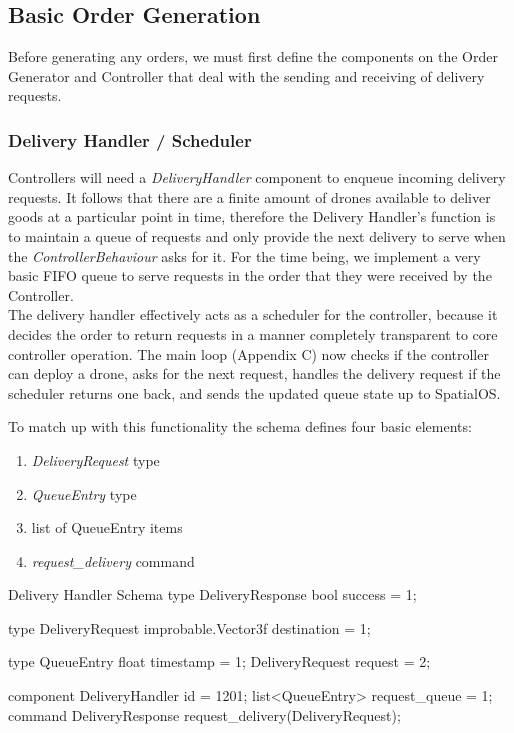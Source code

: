 \documentclass[a4paper,12pt,titlepage]{article}
\begin{document}
\subsection{Basic Order Generation}
Before generating any orders, we must first define the components on the Order Generator and Controller that deal with the sending and receiving of delivery requests.

\subsubsection{Delivery Handler / Scheduler}
Controllers will need a \textit{DeliveryHandler} component to enqueue incoming delivery requests. It follows that there are a finite amount of drones available to deliver goods at a particular point in time, therefore the Delivery Handler's function is to maintain a queue of requests and only provide the next delivery to serve when the \textit{ControllerBehaviour} asks for it. For the time being, we implement a very basic FIFO queue to serve requests in the order that they were received by the Controller.\\

The delivery handler effectively acts as a scheduler for the controller, because it decides the order to return requests in a manner completely transparent to core controller operation. The main loop (Appendix C) now checks if the controller can deploy a drone, asks for the next request, handles the delivery request if the scheduler returns one back, and sends the updated queue state up to SpatialOS.

\newpage
To match up with this functionality the schema defines four basic elements:
\begin{enumerate}
  \item \textit{DeliveryRequest} type
  \item \textit{QueueEntry} type
  \item list of QueueEntry items
  \item \textit{request\_delivery} command
\end{enumerate}

\begin{sexylisting}[colback=white]{Delivery Handler Schema}
type DeliveryResponse {
  bool success = 1;
}

type DeliveryRequest {
  improbable.Vector3f destination = 1;
}

type QueueEntry {
  float timestamp = 1;
  DeliveryRequest request = 2;
}

component DeliveryHandler {
  id = 1201;
  list<QueueEntry> request_queue = 1;
  command DeliveryResponse request_delivery(DeliveryRequest);
}
\end{sexylisting}
\end{document}
